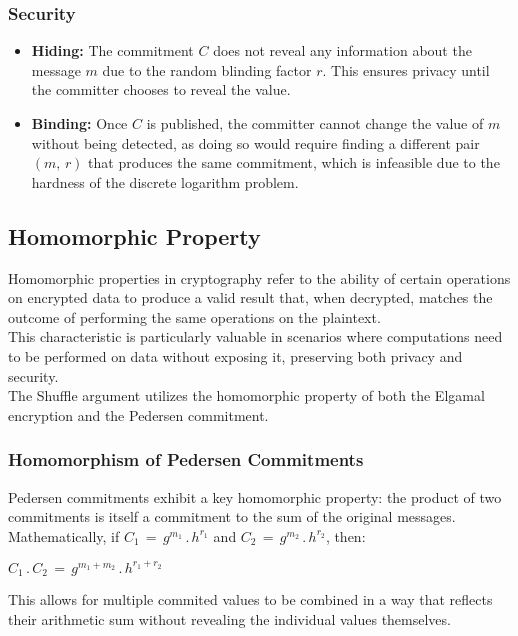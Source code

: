 \documentclass[12pt,a4paper]{report}
\begin{document}
\subsubsection{Security}
\begin{itemize}
	\item \textbf{Hiding:} The commitment $C$ does not reveal any information about the message $m$ due to the random blinding factor $r$. This ensures privacy until the committer chooses to reveal the value.
	\item \textbf{Binding:} Once $C$ is published, the committer cannot change the value of $m$ without being detected, as doing so would require finding a different pair $(m,\,r)$ that produces the same commitment, which is infeasible due to the hardness of the discrete logarithm problem.
\end{itemize}
\subsection{Homomorphic Property}
Homomorphic properties in cryptography refer to the ability of certain 
operations on encrypted data to produce a valid result that, 
when decrypted, matches the outcome of performing the same operations on the plaintext.\\
This characteristic is particularly valuable in scenarios where computations need to be performed on data without exposing it, preserving both privacy and security.\\
The Shuffle argument utilizes the homomorphic property of both the Elgamal encryption and the Pedersen commitment.
\subsubsection{Homomorphism of Pedersen Commitments}
Pedersen commitments exhibit a key homomorphic property: the product of two commitments is itself a commitment to the sum of the original messages.
Mathematically, if $C_1\,=\,g^{m_1}\,.\,h^{r_1}$ and $C_2\,=\,g^{m_2}\,.\,h^{r_2}$, then:\\ 
\begin{center}
$C_1\,.\,C_2\,=\,g^{m_1 + m_2}\,.\,h^{r_1 + r_2}$
\end{center}
This allows for multiple commited values to be combined in a way that reflects their arithmetic sum without revealing the individual values themselves.
\end{document}
